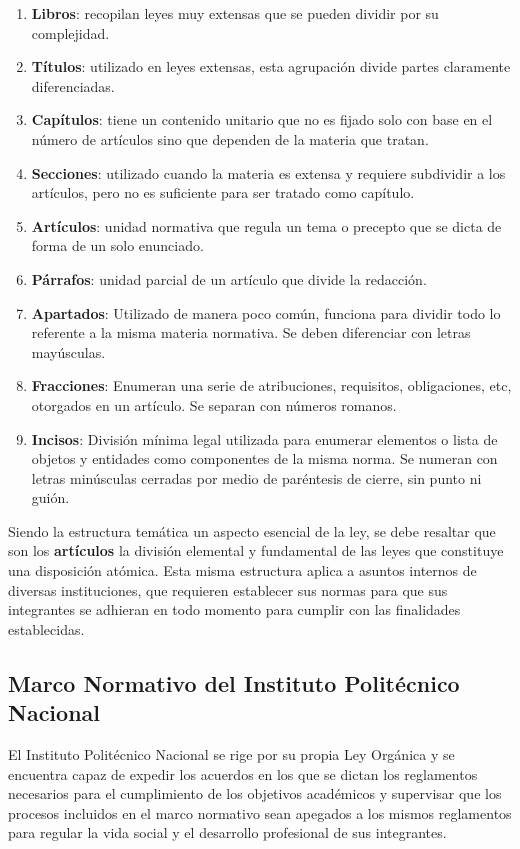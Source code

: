 \begin{enumerate}
    \item \textbf{Libros}: recopilan leyes muy extensas que se pueden dividir por su complejidad.
    \item \textbf{Títulos}: utilizado en leyes extensas, esta agrupación divide partes claramente diferenciadas.
    \item \textbf{Capítulos}: tiene un contenido unitario que no es fijado solo con base en el número de artículos sino que dependen de la materia que tratan.
    \item \textbf{Secciones}: utilizado cuando la materia es extensa y requiere subdividir a los artículos, pero no es suficiente para ser tratado como capítulo.
    \item \textbf{Artículos}: unidad normativa que regula un tema o precepto que se dicta de forma de un solo enunciado.
    \item \textbf{Párrafos}: unidad parcial de un artículo que divide la redacción.
    \item \textbf{Apartados}: Utilizado de manera poco común, funciona para dividir todo lo referente a la misma materia normativa. Se deben diferenciar con letras mayúsculas.
    \item \textbf{Fracciones}: Enumeran una serie de atribuciones, requisitos, obligaciones, etc, otorgados en un artículo. Se separan con números romanos.
    \item \textbf{Incisos}: División mínima legal utilizada para enumerar elementos o lista de objetos y entidades como componentes de la misma norma. Se numeran con letras minúsculas cerradas por medio de paréntesis de cierre, sin punto ni guión.
\end{enumerate}

Siendo la estructura temática un aspecto esencial de la ley, se debe resaltar que son los \textbf{artículos} la división elemental y fundamental de las leyes que constituye una disposición atómica. Esta misma estructura aplica a asuntos internos de diversas instituciones, que requieren establecer sus normas para que sus integrantes se adhieran en todo momento para cumplir con las finalidades establecidas.


\subsection{Marco Normativo del Instituto Politécnico Nacional}
\label{subsec:marco-normativo-ipn}

El Instituto Politécnico Nacional se rige por su propia Ley Orgánica y se encuentra capaz de expedir los acuerdos en los que se dictan los reglamentos necesarios para el cumplimiento de los objetivos académicos y supervisar que los procesos incluidos en el marco normativo sean apegados a los mismos reglamentos para regular la vida social y el desarrollo profesional de sus integrantes.


